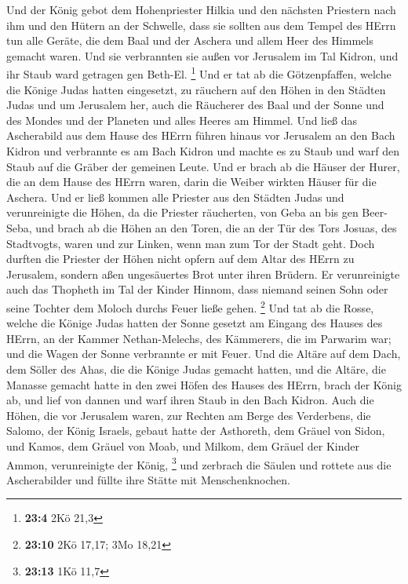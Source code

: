  Und der König gebot dem Hohenpriester Hilkia und den
nächsten Priestern nach ihm und den Hütern an der Schwelle, dass sie
sollten aus dem Tempel des HErrn tun alle Geräte, die dem Baal und der
Aschera und allem Heer des Himmels gemacht waren. Und sie verbrannten
sie außen vor Jerusalem im Tal Kidron, und ihr Staub ward getragen gen
Beth-El. \footnote{\textbf{23:4} 2Kö 21,3}  Und er tat ab
die Götzenpfaffen, welche die Könige Judas hatten eingesetzt, zu
räuchern auf den Höhen in den Städten Judas und um Jerusalem her, auch
die Räucherer des Baal und der Sonne und des Mondes und der Planeten und
alles Heeres am Himmel.  Und ließ das Ascherabild aus dem
Hause des HErrn führen hinaus vor Jerusalem an den Bach Kidron und
verbrannte es am Bach Kidron und machte es zu Staub und warf den Staub
auf die Gräber der gemeinen Leute.  Und er brach ab die
Häuser der Hurer, die an dem Hause des HErrn waren, darin die Weiber
wirkten Häuser für die Aschera.  Und er ließ kommen alle
Priester aus den Städten Judas und verunreinigte die Höhen, da die
Priester räucherten, von Geba an bis gen Beer-Seba, und brach ab die
Höhen an den Toren, die an der Tür des Tors Josuas, des Stadtvogts,
waren und zur Linken, wenn man zum Tor der Stadt geht. 
Doch durften die Priester der Höhen nicht opfern auf dem Altar des HErrn
zu Jerusalem, sondern aßen ungesäuertes Brot unter ihren Brüdern.
 Er verunreinigte auch das Thopheth im Tal der Kinder
Hinnom, dass niemand seinen Sohn oder seine Tochter dem Moloch durchs
Feuer ließe gehen. \footnote{\textbf{23:10} 2Kö 17,17; 3Mo 18,21}
 Und tat ab die Rosse, welche die Könige Judas hatten der
Sonne gesetzt am Eingang des Hauses des HErrn, an der Kammer
Nethan-Melechs, des Kämmerers, die im Parwarim war; und die Wagen der
Sonne verbrannte er mit Feuer.  Und die Altäre auf dem
Dach, dem Söller des Ahas, die die Könige Judas gemacht hatten, und die
Altäre, die Manasse gemacht hatte in den zwei Höfen des Hauses des
HErrn, brach der König ab, und lief von dannen und warf ihren Staub in
den Bach Kidron.  Auch die Höhen, die vor Jerusalem
waren, zur Rechten am Berge des Verderbens, die Salomo, der König
Israels, gebaut hatte der Asthoreth, dem Gräuel von Sidon, und Kamos,
dem Gräuel von Moab, und Milkom, dem Gräuel der Kinder Ammon,
verunreinigte der König, \footnote{\textbf{23:13} 1Kö 11,7}
 und zerbrach die Säulen und rottete aus die
Ascherabilder und füllte ihre Stätte mit Menschenknochen.

